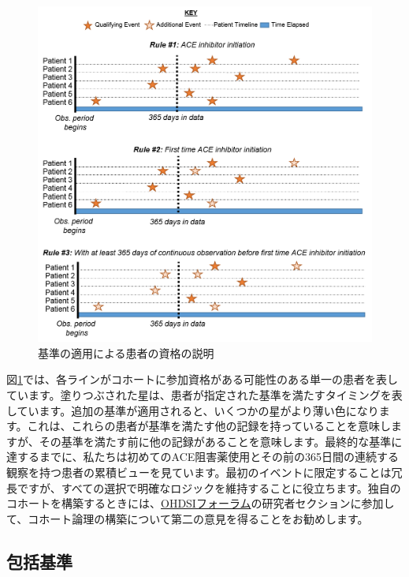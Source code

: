 \documentclass[
  11pt]{book}
\theoremstyle{definition}
\theoremstyle{definition}
\theoremstyle{definition}
\theoremstyle{definition}
\theoremstyle{remark}
\begin{document}
\begin{figure}

{\centering \includegraphics[width=1\linewidth]{images/Cohorts/EarliestEventExplained} 

}

\caption{基準の適用による患者の資格の説明}\label{fig:EarliestEventExplained}
\end{figure}

図\ref{fig:EarliestEventExplained}では、各ラインがコホートに参加資格がある可能性のある単一の患者を表しています。塗りつぶされた星は、患者が指定された基準を満たすタイミングを表しています。追加の基準が適用されると、いくつかの星がより薄い色になります。これは、これらの患者が基準を満たす他の記録を持っていることを意味しますが、その基準を満たす前に他の記録があることを意味します。最終的な基準に達するまでに、私たちは初めてのACE阻害薬使用とその前の365日間の連続する観察を持つ患者の累積ビューを見ています。最初のイベントに限定することは冗長ですが、すべての選択で明確なロジックを維持することに役立ちます。独自のコホートを構築するときには、\href{http://forums.ohdsi.org}{OHDSIフォーラム}の研究者セクションに参加して、コホート論理の構築について第二の意見を得ることをお勧めします。

\subsection{包括基準}\label{ux5305ux62ecux57faux6e96}
\end{document}
